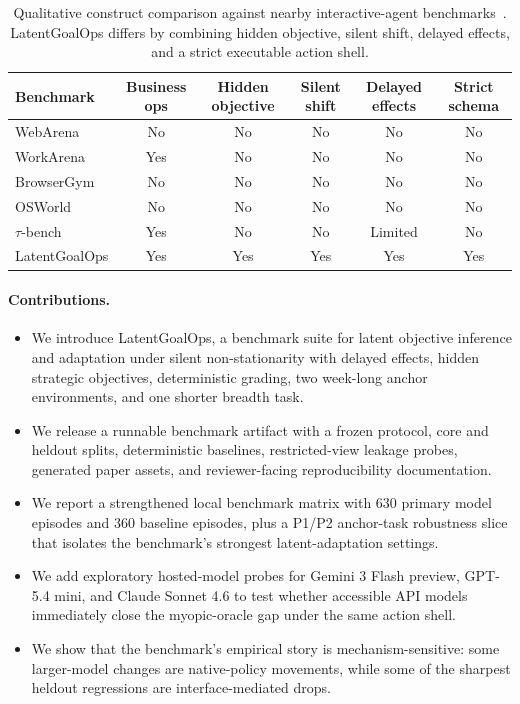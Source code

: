 \documentclass{article}
\begin{document}
\begin{table}[t]
  \centering
  \scriptsize
  \setlength{\tabcolsep}{4pt}
  \begin{tabular}{lccccc}
    \toprule
    Benchmark & Business ops & Hidden objective & Silent shift & Delayed effects & Strict schema \\
    \midrule
    WebArena & No & No & No & No & No \\
    WorkArena & Yes & No & No & No & No \\
    BrowserGym & No & No & No & No & No \\
    OSWorld & No & No & No & No & No \\
    \textsc{$\tau$}-bench & Yes & No & No & Limited & No \\
    LatentGoalOps & Yes & Yes & Yes & Yes & Yes \\
    \bottomrule
  \end{tabular}
  \caption{Qualitative construct comparison against nearby interactive-agent
  benchmarks~\citep{webarena,workarena,browsergym,osworld,taubench}. LatentGoalOps
  differs by combining hidden objective, silent shift, delayed effects, and a
  strict executable action shell.}
  \label{tab:comparison}
\end{table}

\paragraph{Contributions.}
\begin{itemize}[leftmargin=1.5em]
  \item We introduce LatentGoalOps, a benchmark suite for latent objective
  inference and adaptation under silent non-stationarity with delayed effects,
  hidden strategic objectives, deterministic grading, two week-long anchor
  environments, and one shorter breadth task.
  \item We release a runnable benchmark artifact with a frozen protocol,
  core and heldout splits, deterministic baselines, restricted-view leakage
  probes, generated paper assets, and reviewer-facing reproducibility
  documentation.
  \item We report a strengthened local benchmark matrix with 630 primary model
  episodes and 360 baseline episodes, plus a P1/P2 anchor-task robustness
  slice that isolates the benchmark's strongest latent-adaptation settings.
  \item We add exploratory hosted-model probes for Gemini 3 Flash preview,
  GPT-5.4 mini, and Claude Sonnet 4.6 to test whether accessible API models
  immediately close the myopic-oracle gap under the same action shell.
  \item We show that the benchmark's empirical story is mechanism-sensitive:
  some larger-model changes are native-policy movements, while some of the
  sharpest heldout regressions are interface-mediated drops.
\end{itemize}
\end{document}
